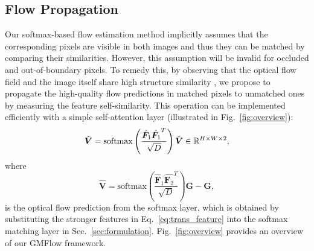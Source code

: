 \documentclass[10pt,twocolumn,letterpaper]{article}
\begin{document}
\subsection{Flow Propagation}
Our softmax-based flow estimation method implicitly assumes that the corresponding pixels are visible in both images and thus they can be matched by comparing their similarities. However, this assumption will be invalid for occluded and out-of-boundary pixels. To remedy this, by observing that the optical flow field and the image itself share high structure similarity \cite{hui2020liteflownet3,Jiang_2021_ICCV}, we propose to propagate the high-quality flow predictions in matched pixels to unmatched ones by measuring the feature self-similarity. This operation can be implemented efficiently with a simple self-attention layer (illustrated in Fig.~\ref{fig:overview}):
\begin{equation}
    \Tilde{\bm V} = \mathrm{softmax} \left(\frac{\hat{\bm F}_1 \hat{\bm F_1}^T}{\sqrt{D}}\right) \hat{\bm V}  \in \mathbb{R}^{H \times W \times 2},
\end{equation}
where
\begin{equation}
    \hat{\bm V} = \mathrm{softmax} \left(\frac{\hat{\bm F}_1 \hat{\bm F_2}^T}{\sqrt{D}}\right) {\bm G} - {\bm G},
\end{equation}
is the optical flow prediction from the softmax layer, which is obtained by substituting the stronger features in Eq.~\eqref{eq:trans_feature} into the softmax matching layer in Sec.~\ref{sec:formulation}. Fig.~\ref{fig:overview} provides an overview of our GMFlow framework.
\end{document}
